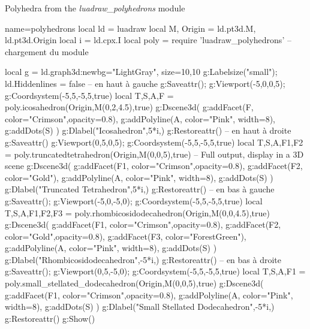 \begin{demo}{Polyhedra from the \emph{luadraw\_polyhedrons} module}
\begin{luadraw}{name=polyhedrons}
local ld = luadraw
local M, Origin = ld.pt3d.M, ld.pt3d.Origin
local i = ld.cpx.I
local poly = require 'luadraw_polyhedrons' -- chargement du module

local g = ld.graph3d:new{bg="LightGray", size={10,10}}
g:Labelsize("small"); ld.Hiddenlines = false
-- en haut à gauche 
g:Saveattr(); g:Viewport(-5,0,0,5); g:Coordsystem(-5,5,-5,5,true)
local T,S,A,F = poly.icosahedron(Origin,M(0,2,4.5),true) 
g:Dscene3d(
    g:addFacet(F, {color="Crimson",opacity=0.8}),
    g:addPolyline(A, {color="Pink", width=8}),
    g:addDots(S) )
g:Dlabel("Icosahedron",5*i,{})
g:Restoreattr()
-- en haut à droite
g:Saveattr()
g:Viewport(0,5,0,5); g:Coordsystem(-5,5,-5,5,true)
local T,S,A,F1,F2 = poly.truncatedtetrahedron(Origin,M(0,0,5),true) -- Full output, display in a 3D scene
g:Dscene3d(
    g:addFacet(F1, {color="Crimson",opacity=0.8}),
    g:addFacet(F2, {color="Gold"}),
    g:addPolyline(A, {color="Pink", width=8}),
    g:addDots(S) )
g:Dlabel("Truncated Tetrahedron",5*i,{})
g:Restoreattr()
-- en bas à gauche
g:Saveattr(); g:Viewport(-5,0,-5,0); g:Coordsystem(-5,5,-5,5,true)
local T,S,A,F1,F2,F3 = poly.rhombicosidodecahedron(Origin,M(0,0,4.5),true)
g:Dscene3d(
    g:addFacet(F1, {color="Crimson",opacity=0.8}),
    g:addFacet(F2, {color="Gold",opacity=0.8}), g:addFacet(F3, {color="ForestGreen"}),
    g:addPolyline(A, {color="Pink", width=8}), g:addDots(S) )
g:Dlabel("Rhombicosidodecahedron",-5*i,{})
g:Restoreattr()
-- en bas à droite
g:Saveattr(); g:Viewport(0,5,-5,0); g:Coordsystem(-5,5,-5,5,true)
local T,S,A,F1 = poly.small_stellated_dodecahedron(Origin,M(0,0,5),true)
g:Dscene3d(
    g:addFacet(F1, {color="Crimson",opacity=0.8}),
    g:addPolyline(A, {color="Pink", width=8}),
    g:addDots(S) )
g:Dlabel("Small Stellated Dodecahedron",-5*i,{})
g:Restoreattr()
g:Show()
\end{luadraw}
\end{demo}
